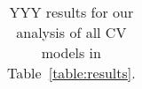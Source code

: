 \begin{table}[t]
\begin{center}
\begin{tabular}{|c|c|c|c|c|c|}
\hline
\end{tabular}
\vspace{-5mm}
\end{center}
\caption{YYY results for our analysis of all CV models in Table~\ref{table:results}. }
\label{table:R2results}
\end{table}

